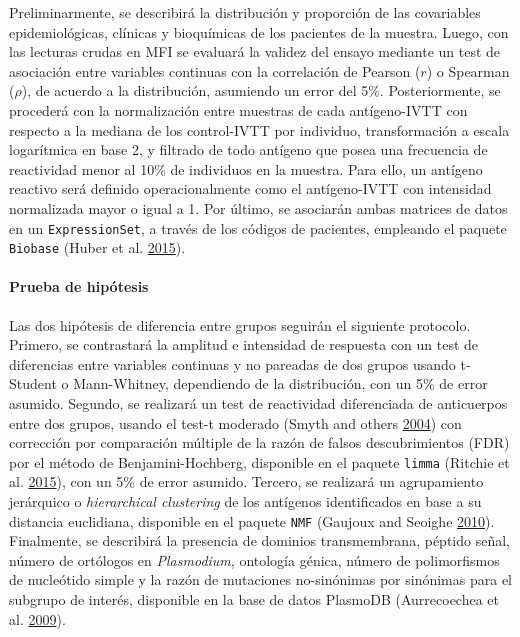 \documentclass[
  a4paper]{article}
\let\oldparagraph\paragraph
\renewcommand{\paragraph}[1]{\oldparagraph{#1}\mbox{}}
\begin{document}
Preliminarmente, se describirá la distribución y proporción de las
covariables epidemiológicas, clínicas y bioquímicas de los pacientes de
la muestra. Luego, con las lecturas crudas en MFI se evaluará la validez
del ensayo mediante un test de asociación entre variables continuas con
la correlación de Pearson (\(r\)) o Spearman (\(\rho\)), de acuerdo a la
distribución, asumiendo un error del 5\%. Posteriormente, se procederá
con la normalización entre muestras de cada antígeno-IVTT con respecto a
la mediana de los control-IVTT por individuo, transformación a escala
logarítmica en base 2, y filtrado de todo antígeno que posea una
frecuencia de reactividad menor al 10\% de individuos en la muestra.
Para ello, un antígeno reactivo será definido operacionalmente como el
antígeno-IVTT con intensidad normalizada mayor o igual a 1. Por último,
se asociarán ambas matrices de datos en un \texttt{ExpressionSet}, a
través de los códigos de pacientes, empleando el paquete
\texttt{Biobase} (Huber et al. \protect\hyperlink{ref-Biobase}{2015}).

\hypertarget{prueba-de-hipuxf3tesis}{%
\paragraph{Prueba de hipótesis}\label{prueba-de-hipuxf3tesis}}

Las dos hipótesis de diferencia entre grupos seguirán el siguiente
protocolo. Primero, se contrastará la amplitud e intensidad de respuesta
con un test de diferencias entre variables continuas y no pareadas de
dos grupos usando t-Student o Mann-Whitney, dependiendo de la
distribución, con un 5\% de error asumido. Segundo, se realizará un test
de reactividad diferenciada de anticuerpos entre dos grupos, usando el
test-t moderado (Smyth and others
\protect\hyperlink{ref-smyth2004ebayes}{2004}) con corrección por
comparación múltiple de la razón de falsos descubrimientos (FDR) por el
método de Benjamini-Hochberg, disponible en el paquete \texttt{limma}
(Ritchie et al. \protect\hyperlink{ref-limma}{2015}), con un 5\% de
error asumido. Tercero, se realizará un agrupamiento jerárquico o
\emph{hierarchical clustering} de los antígenos identificados en base a
su distancia euclidiana, disponible en el paquete \texttt{NMF} (Gaujoux
and Seoighe \protect\hyperlink{ref-Gaujoux2010NMF}{2010}). Finalmente,
se describirá la presencia de dominios transmembrana, péptido señal,
número de ortólogos en \emph{Plasmodium}, ontología génica, número de
polimorfismos de nucleótido simple y la razón de mutaciones no-sinónimas
por sinónimas para el subgrupo de interés, disponible en la base de
datos PlasmoDB (Aurrecoechea et al.
\protect\hyperlink{ref-plasmodb}{2009}).
\end{document}
